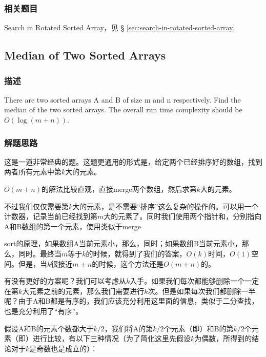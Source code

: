 \subsubsection{相关题目}

\begindot
\item Search in Rotated Sorted Array，见 \S 
\ref{sec:search-in-rotated-sorted-array}
\myenddot


\subsection{Median of Two Sorted Arrays}
\label{sec:median-of-two-sorted-arrays}


\subsubsection{描述}
There are two sorted arrays A and B of size m and n respectively. Find the 
median of the two sorted arrays. The overall run time complexity should be 
$O(\log (m+n))$.


\subsubsection{解题思路}
这是一道非常经典的题。这题更通用的形式是，给定两个已经排序好的数组，找到两者所有元素中第$k$大的元素。

$O(m+n)$的解法比较直观，直接merge两个数组，然后求第$k$大的元素。

不过我们仅仅需要第$k$大的元素，是不需要“排序”这么复杂的操作的。可以用一个计数器，记录当前已经找到第$m$大的元素了。同时我们使用两个指针和，分别指向A和B数组的第一个元素，使用类似于merge
 
sort的原理，如果数组A当前元素小，那么，同时；如果数组B当前元素小，那么，同时。最终当$m$等于$k$的时候，就得到了我们的答案，$O(k)$时间，$O(1)$空间。但是，当$k$很接近$m+n$的时候，这个方法还是$O(m+n)$的。

有没有更好的方案呢？我们可以考虑从$k$入手。如果我们每次都能够删除一个一定在第$k$大元素之前的元素，那么我们需要进行$k$次。但是如果每次我们都删除一半呢？由于A和B都是有序的，我们应该充分利用这里面的信息，类似于二分查找，也是充分利用了“有序”。

假设A和B的元素个数都大于$k/2$，我们将A的第$k/2$个元素（即）和B的第$k/2$个元素（即）进行比较，有以下三种情况（为了简化这里先假设$k$为偶数，所得到的结论对于$k$是奇数也是成立的）：
\begindot
\item {}
\item {}
\item {}
\myenddot

